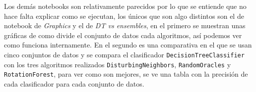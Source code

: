 Los demás notebooks son relativamente parecidos por lo que se entiende que no hace falta explicar como se ejecutan, los únicos que son algo distintos son el de notebook de \textit{Graphics} y el de \textit{DT vs ensembles}, en el primero se muestran unas gráficas de como divide el conjunto de datos cada algoritmos, así podemos ver como funciona internamente. En el segundo es una comparativa en el que se usan cinco conjuntos de datos y se compara el clasificador \texttt{DecisionTreeClassifier} con los tres algoritmos realizados \texttt{DisturbingNeighbors}, \texttt{RandomOracles} y \texttt{RotationForest}, para ver como son mejores, se ve una tabla con la precisión de cada clasificador para cada conjunto de datos.